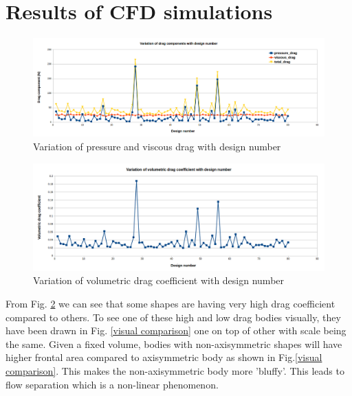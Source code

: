 \section{Results of CFD simulations}
\begin{figure}[H]
	\centering
	\includegraphics[width=450 pt]{surrogate_model_CFD_results/Drag_components.png}
	\caption{Variation of pressure and viscous drag with design number}
	\label{Drag components plot} %
\end{figure}

\begin{figure}[H]
	\centering
	\includegraphics[width=450 pt]{surrogate_model_CFD_results/Volumetric_drag_coeff.png}
	\caption{Variation of volumetric drag coefficient with design number}
	\label{Volumetric drag coefficient plot} %
\end{figure}

From Fig. \ref{Volumetric drag coefficient plot} we can see that some shapes are having very high drag coefficient compared to others. To see one of these high and low drag bodies visually, they have been drawn in Fig. \ref{visual comparison} one on top of other with scale being the same. Given a fixed volume, bodies with non-axisymmetric shapes will have higher frontal area compared to axisymmetric body as shown in Fig.\ref{visual comparison}. This makes the non-axisymmetric body more 'bluffy'. This leads to flow separation which is a non-linear phenomenon.

